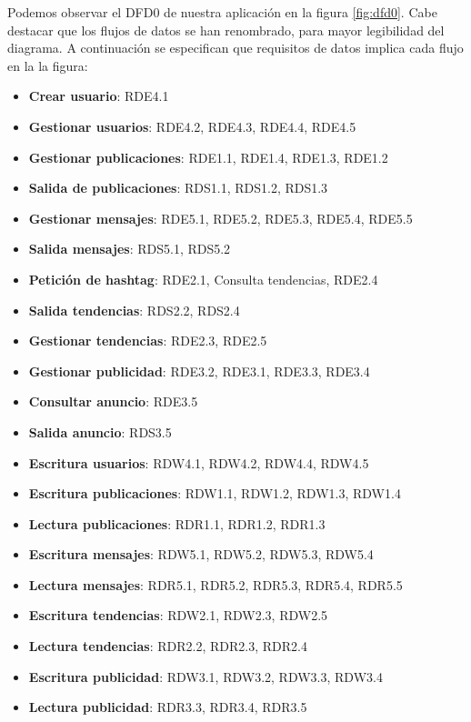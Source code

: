 Podemos observar el DFD0 de nuestra aplicación en la figura \ref{fig:dfd0}. Cabe destacar que los flujos de datos se han renombrado, para mayor legibilidad del diagrama. 
A continuación se especifican que requisitos de datos implica cada flujo en la la figura:
\begin{itemize}
    \item \textbf{Crear usuario}: RDE4.1
    \item \textbf{Gestionar usuarios}: RDE4.2, RDE4.3, RDE4.4, RDE4.5
    \item \textbf{Gestionar publicaciones}: RDE1.1, RDE1.4, RDE1.3, RDE1.2
    \item \textbf{Salida de publicaciones}: RDS1.1, RDS1.2, RDS1.3
    \item \textbf{Gestionar mensajes}: RDE5.1, RDE5.2, RDE5.3, RDE5.4, RDE5.5
    \item \textbf{Salida mensajes}: RDS5.1, RDS5.2
    \item \textbf{Petición de hashtag}: RDE2.1, Consulta tendencias, RDE2.4  
    \item \textbf{Salida tendencias}: RDS2.2, RDS2.4
    \item \textbf{Gestionar tendencias}: RDE2.3, RDE2.5
    \item \textbf{Gestionar publicidad}: RDE3.2, RDE3.1, RDE3.3, RDE3.4
    \item \textbf{Consultar anuncio}: RDE3.5
    \item \textbf{Salida anuncio}: RDS3.5
    
    \item \textbf{Escritura usuarios}: RDW4.1, RDW4.2, RDW4.4, RDW4.5
    \item \textbf{Escritura publicaciones}: RDW1.1, RDW1.2, RDW1.3, RDW1.4
    \item \textbf{Lectura publicaciones}: RDR1.1, RDR1.2, RDR1.3
    \item \textbf{Escritura mensajes}: RDW5.1, RDW5.2, RDW5.3, RDW5.4
    \item \textbf{Lectura mensajes}: RDR5.1, RDR5.2, RDR5.3, RDR5.4, RDR5.5
    \item \textbf{Escritura tendencias}: RDW2.1, RDW2.3, RDW2.5
    \item \textbf{Lectura tendencias}: RDR2.2, RDR2.3, RDR2.4
    \item \textbf{Escritura publicidad}: RDW3.1, RDW3.2, RDW3.3, RDW3.4
    \item \textbf{Lectura publicidad}: RDR3.3, RDR3.4, RDR3.5
    
\end{itemize}


